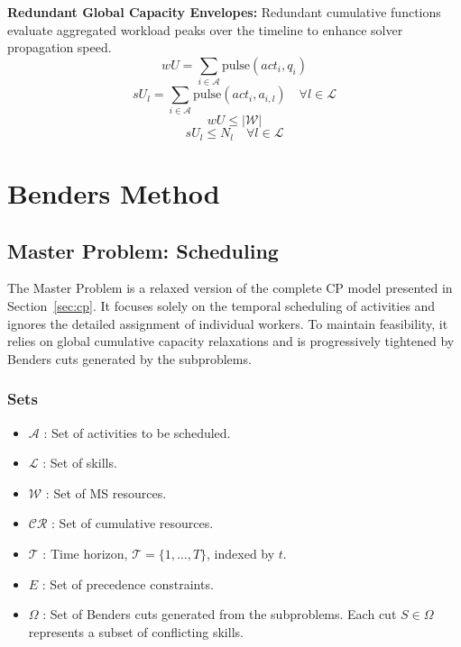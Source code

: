 \documentclass[preprint, authoryear,11pt]{elsarticle}
\begin{document}
\noindent \textbf{Redundant Global Capacity Envelopes:} Redundant cumulative functions evaluate aggregated workload peaks over the timeline to enhance solver propagation speed.
\begin{equation}
    wU = \sum_{i \in \mathcal{A}} \text{pulse}(act_i, q_i)
\end{equation}
\begin{equation}
    sU_l = \sum_{i \in \mathcal{A}} \text{pulse}(act_i, a_{i,l}) \quad \forall l \in \mathcal{L}
\end{equation}
\begin{equation}
    wU \le |\mathcal{W}|
\end{equation}
\begin{equation}
    sU_l \le N_l \quad \forall l \in \mathcal{L}
\end{equation}

\section{Benders Method}
\label{sec:lbbd}

\subsection{Master Problem: Scheduling}\label{master}

The Master Problem is a relaxed version of the complete CP model presented in Section~\ref{sec:cp}. It focuses solely on the temporal scheduling of activities and ignores the detailed assignment of individual workers. To maintain feasibility, it relies on global cumulative capacity relaxations and is progressively tightened by Benders cuts generated by the subproblems.

\subsubsection{Sets}
\begin{itemize}
    \item $\mathcal{A}$ : Set of activities to be scheduled.
    \item $\mathcal{L}$ : Set of skills.
    \item $\mathcal{W}$ : Set of MS resources.
    \item $\mathcal{CR}$ : Set of cumulative resources.
    \item $\mathcal{T}$ : Time horizon, $\mathcal{T} = \{1, \dots, T\}$, indexed by $t$.
    \item $E$ : Set of precedence constraints.
    \item $\Omega$ : Set of Benders cuts generated from the subproblems. Each cut $S \in \Omega$ represents a subset of conflicting skills.
\end{itemize}
\end{document}
